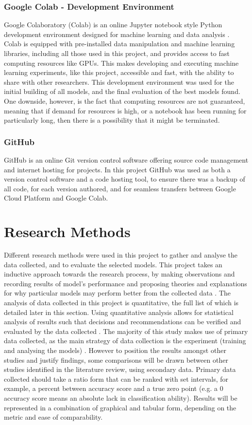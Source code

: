 \subsubsection{Google Colab - Development Environment}
Google Colaboratory (Colab) is an online Jupyter notebook style Python development environment designed for machine learning and data analysis \citep{GoogleCo52:online}. Colab is equipped with pre-installed data manipulation and machine learning libraries, including all those used in this project, and provides access to fast computing resources like GPUs. This makes developing and executing machine learning experiments, like this project, accessible and fast, with the ability to share with other researchers. This development environment was used for the initial building of all models, and the final evaluation of the best models found. One downside, however, is the fact that computing resources are not guaranteed, meaning that if demand for resources is high, or a notebook has been running for particularly long, then there is a possibility that it might be terminated.

\subsubsection{GitHub}
GitHub is an online Git version control software offering source code management and internet hosting for projects. In this project GitHub was used as both a version control software and a code hosting tool, to ensure there was a backup of all code, for each version authored, and for seamless transfers between Google Cloud Platform and Google Colab.

\section{Research Methods}
Different research methods were used in this project to gather and analyse the data collected, and to evaluate the selected models. This project takes an inductive approach towards the research process, by making observations and recording results of model's performance and proposing theories and explanations for why particular models may perform better from the collected data \citep{saunders2009research}. The analysis of data collected in this project is quantitative, the full list of which is detailed later in this section. Using quantitative analysis allows for statistical analysis of results such that decisions and recommendations can be verified and evaluated by the data collected \citep{saunders2009research}. The majority of this study makes use of primary data collected, as the main strategy of data collection is the experiment (training and analysing the models) \citep{hox2005data}. However to position the results amongst other studies and justify findings, some comparisons will be drawn between other studies identified in the literature review, using secondary data. Primary data collected should take a ratio form that can be ranked with set intervals, for example, a percent between accuracy score and a true zero point (e.g. a 0 accuracy score means an absolute lack in classification ability). Results will be represented in a combination of graphical and tabular form, depending on the metric and ease of comparability. 

